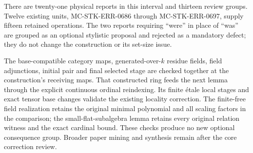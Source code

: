There are twenty-one physical reports in this interval and thirteen review groups. Twelve existing units, MC-\AlgebraIdentifierBreak{}STK-\AlgebraIdentifierBreak{}ERR-\AlgebraIdentifierBreak{}0686 through MC-\AlgebraIdentifierBreak{}STK-\AlgebraIdentifierBreak{}ERR-\AlgebraIdentifierBreak{}0697, supply fifteen retained operations. The two reports requiring ``were'' in place of ``was'' are grouped as an optional stylistic proposal and rejected as a mandatory defect; they do not change the construction or its set-size issue.

The base-compatible category maps, generated-over-\(k\) residue fields, field adjunctions, initial pair and final selected stage are checked together at the construction's receiving maps. That constructed ring feeds the next lemma through the explicit continuous ordinal reindexing. Its finite étale local stages and exact tensor base changes validate the existing locality correction. The finite-free field realization retains the original minimal polynomial and all scaling factors in the comparison; the small-flat-subalgebra lemma retains every original relation witness and the exact cardinal bound. These checks produce no new optional consequence group. Broader paper mining and synthesis remain after the core correction review.
